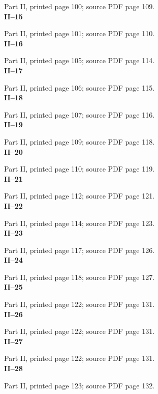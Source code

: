 \documentclass[11pt,a4paper,oneside]{book}
\begin{document}
\smallskip
Part II, printed page 100; source PDF page 109.
\vfill
\[

\]
\vfill
\newpage
\noindent\textbf{II--15}\par
\smallskip
Part II, printed page 101; source PDF page 110.
\vfill
\[

\]
\vfill
\newpage
\noindent\textbf{II--16}\par
\smallskip
Part II, printed page 105; source PDF page 114.
\vfill
\[

\]
\vfill
\newpage
\noindent\textbf{II--17}\par
\smallskip
Part II, printed page 106; source PDF page 115.
\vfill
\[

\]
\vfill
\newpage
\noindent\textbf{II--18}\par
\smallskip
Part II, printed page 107; source PDF page 116.
\vfill
\[

\]
\vfill
\newpage
\noindent\textbf{II--19}\par
\smallskip
Part II, printed page 109; source PDF page 118.
\vfill
\[

\]
\vfill
\newpage
\noindent\textbf{II--20}\par
\smallskip
Part II, printed page 110; source PDF page 119.
\vfill
\[

\]
\vfill
\newpage
\noindent\textbf{II--21}\par
\smallskip
Part II, printed page 112; source PDF page 121.
\vfill
\[

\]
\vfill
\newpage
\noindent\textbf{II--22}\par
\smallskip
Part II, printed page 114; source PDF page 123.
\vfill
\[

\]
\vfill
\newpage
\noindent\textbf{II--23}\par
\smallskip
Part II, printed page 117; source PDF page 126.
\vfill
\[

\]
\vfill
\newpage
\noindent\textbf{II--24}\par
\smallskip
Part II, printed page 118; source PDF page 127.
\vfill
\[

\]
\vfill
\newpage
\noindent\textbf{II--25}\par
\smallskip
Part II, printed page 122; source PDF page 131.
\vfill
\[

\]
\vfill
\newpage
\noindent\textbf{II--26}\par
\smallskip
Part II, printed page 122; source PDF page 131.
\vfill
\[

\]
\vfill
\newpage
\noindent\textbf{II--27}\par
\smallskip
Part II, printed page 122; source PDF page 131.
\vfill
\[

\]
\vfill
\newpage
\noindent\textbf{II--28}\par
\smallskip
Part II, printed page 123; source PDF page 132.
\end{document}
